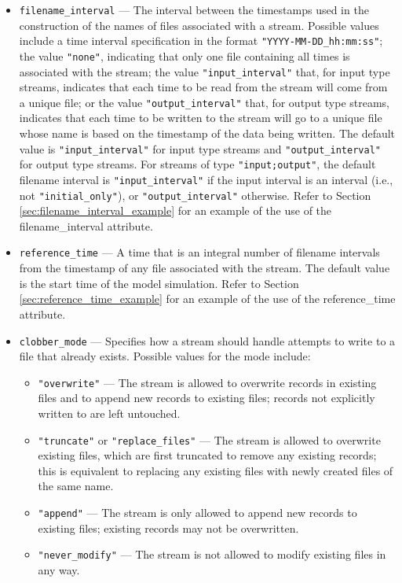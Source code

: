 \begin{itemize}
\item {\tt filename\_interval} --- The interval between the timestamps used in the construction of the names of files associated with
a stream. Possible values include a time interval specification in the format {\tt "YYYY-MM-DD\_hh:mm:ss"}; the value {\tt "none"}, indicating
that only one file containing all times is associated with the stream; the value {\tt "input\_interval"} that, for input type streams, indicates that
each time to be read from the stream will come from a unique file; or the value {\tt "output\_interval"} that, for output type streams, indicates 
that each time to be written to the stream will go to a unique file whose name is based on the timestamp of the data being written. The default
value is {\tt "input\_interval"} for input type streams and {\tt "output\_interval"} for output type streams. For streams of type {\tt "input;output"}, the
default filename interval is {\tt "input\_interval"} if the input interval is an interval (i.e., not {\tt "initial\_only"}), or {\tt "output\_interval"} otherwise. 
Refer to Section \ref{sec:filename_interval_example}
for an example of the use of the filename\_interval attribute.
\item {\tt reference\_time} --- A time that is an integral number of filename intervals from the timestamp of any file associated with the stream.
The default value is the start time of the model simulation. Refer to Section \ref{sec:reference_time_example} for an example of 
the use of the reference\_time attribute.
\item {\tt clobber\_mode} --- Specifies how a stream should handle attempts to write to a file that already exists. Possible values
for the mode include:
\begin{itemize}
\item {\tt "overwrite"} --- The stream is allowed to overwrite records in existing files and to append new records 
to existing files; records not explicitly written to are left untouched.
\item {\tt "truncate"} or {\tt "replace\_files"} --- The stream is allowed to overwrite existing files, which are first truncated 
to remove any existing records; this is equivalent to replacing any existing files with newly created files of the same name.
\item {\tt "append"} --- The stream is only allowed to append new records to existing files; existing records may not be overwritten.
\item {\tt "never\_modify"} --- The stream is not allowed to modify existing files in any way.

\end{itemize}
\end{itemize}
